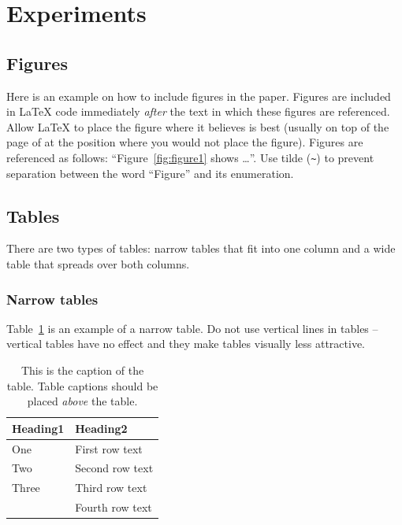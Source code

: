 \documentclass[10pt, a4paper]{article}
\begin{document}
\section{Experiments}

\subsection{Figures}

Here is an example on how to include figures in the paper. Figures are included in \LaTeX{} code immediately \textit{after} the text in which these figures are referenced. Allow \LaTeX{} to place the figure where it believes is best (usually on top of the page of at the position where you would not place the figure). Figures are referenced as follows: ``Figure~\ref{fig:figure1} shows \dots''. Use tilde (\verb.~.) to prevent separation between the word ``Figure'' and its enumeration. 

\subsection{Tables}

There are two types of tables: narrow tables that fit into one column and a wide table that spreads over both columns.

\subsubsection{Narrow tables}

Table~\ref{tab:narrow-table} is an example of a narrow table. Do not use vertical lines in tables -- vertical tables have no effect and they make tables visually less attractive.

\begin{table}
\caption{This is the caption of the table. Table captions should be placed \textit{above} the table.}
\label{tab:narrow-table}
\begin{center}
\begin{tabular}{ll}
\toprule
Heading1 & Heading2 \\
\midrule
One & First row text \\
Two   & Second row text \\
Three   & Third row text \\
      & Fourth row text \\
\bottomrule
\end{tabular}
\end{center}
\end{table}
\end{document}
